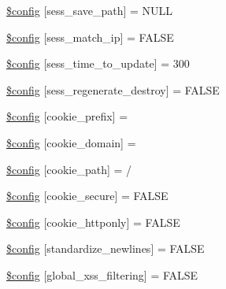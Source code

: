 \begin{DoxyCompactItemize}
\item 
\hyperlink{_admin_2application_2config_2config_8php_ac1db0aa8bd0457f694fdaa99cc7878a1}{\$config} \mbox{[}\textquotesingle{}sess\+\_\+save\+\_\+path\textquotesingle{}\mbox{]} = N\+U\+L\+L
\item 
\hyperlink{_admin_2application_2config_2config_8php_aed449d12f2854249e5f7229fafb269b2}{\$config} \mbox{[}\textquotesingle{}sess\+\_\+match\+\_\+ip\textquotesingle{}\mbox{]} = F\+A\+L\+S\+E
\item 
\hyperlink{_admin_2application_2config_2config_8php_afb6a66c470a9c08b90efcbc6c5594573}{\$config} \mbox{[}\textquotesingle{}sess\+\_\+time\+\_\+to\+\_\+update\textquotesingle{}\mbox{]} = 300
\item 
\hyperlink{_admin_2application_2config_2config_8php_a48025f8c051fea6ea7893d8bb1deb58f}{\$config} \mbox{[}\textquotesingle{}sess\+\_\+regenerate\+\_\+destroy\textquotesingle{}\mbox{]} = F\+A\+L\+S\+E
\item 
\hyperlink{_admin_2application_2config_2config_8php_ae5f35eb62ffdcfa1878ed13fa47b2d5d}{\$config} \mbox{[}\textquotesingle{}cookie\+\_\+prefix\textquotesingle{}\mbox{]} = \textquotesingle{}\textquotesingle{}
\item 
\hyperlink{_admin_2application_2config_2config_8php_a4f967865afe18263372e9c66223a752e}{\$config} \mbox{[}\textquotesingle{}cookie\+\_\+domain\textquotesingle{}\mbox{]} = \textquotesingle{}\textquotesingle{}
\item 
\hyperlink{_admin_2application_2config_2config_8php_aeadefdcde429770b04a079e002194d2f}{\$config} \mbox{[}\textquotesingle{}cookie\+\_\+path\textquotesingle{}\mbox{]} = \textquotesingle{}/\textquotesingle{}
\item 
\hyperlink{_admin_2application_2config_2config_8php_a7d66abd075b76c2fdcd0837068a13b51}{\$config} \mbox{[}\textquotesingle{}cookie\+\_\+secure\textquotesingle{}\mbox{]} = F\+A\+L\+S\+E
\item 
\hyperlink{_admin_2application_2config_2config_8php_aef80aa5675d48ec14b755bd538cafe8b}{\$config} \mbox{[}\textquotesingle{}cookie\+\_\+httponly\textquotesingle{}\mbox{]} = F\+A\+L\+S\+E
\item 
\hyperlink{_admin_2application_2config_2config_8php_a78062f90b7914266529217f31dd050ed}{\$config} \mbox{[}\textquotesingle{}standardize\+\_\+newlines\textquotesingle{}\mbox{]} = F\+A\+L\+S\+E
\item 
\hyperlink{_admin_2application_2config_2config_8php_afee3589eecfa5ebecf39f44c271d58ce}{\$config} \mbox{[}\textquotesingle{}global\+\_\+xss\+\_\+filtering\textquotesingle{}\mbox{]} = F\+A\+L\+S\+E

\end{DoxyCompactItemize}
